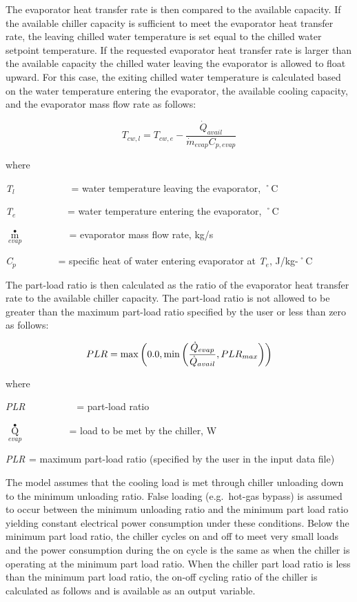 The evaporator heat transfer rate is then compared to the available capacity. If the available chiller capacity is sufficient to meet the evaporator heat transfer rate, the leaving chilled water temperature is set equal to the chilled water setpoint temperature. If the requested evaporator heat transfer rate is larger than the available capacity the chilled water leaving the evaporator is allowed to float upward. For this case, the exiting chilled water temperature is calculated based on the water temperature entering the evaporator, the available cooling capacity, and the evaporator mass flow rate as follows:

\begin{equation}
  T_{cw,l} = T_{cw,e} - \frac{\dot{Q}_{avail}}{\dot{m}_{evap}C_{p,evap}}
\end{equation}

where

\emph{T\(_{l}\)}~~~~~~~~~~~ = water temperature leaving the evaporator, ˚C

\emph{T\(_{e}\)}~~~~~~~~~~ = water temperature entering the evaporator, ˚C

\({\mathop m\limits^ \bullet_{evap}}\) ~~~~~~~~ = evaporator mass flow rate, kg/s

\emph{C\(_{p}\)}~~~~~~~~ = specific heat of water entering evaporator at \emph{T\(_{e}\)}, J/kg-˚C

The part-load ratio is then calculated as the ratio of the evaporator heat transfer rate to the available chiller capacity. The part-load ratio is not allowed to be greater than the maximum part-load ratio specified by the user or less than zero as follows:

\begin{equation}
  PLR = \max\PB{0.0,\min\PB{\frac{\dot{Q}_{evap}}{\dot{Q}_{avail}},PLR_{max}}}
\end{equation}

where

\emph{PLR}~~~~~~~~~~ = part-load ratio

\({\mathop Q\limits^ \bullet_{evap}}\) ~~~~~~~~ = load to be met by the chiller, W

\emph{PLR\(_{ }\)} = maximum part-load ratio (specified by the user in the input data file)

The model assumes that the cooling load is met through chiller unloading down to the minimum unloading ratio. False loading (e.g.~hot-gas bypass) is assumed to occur between the minimum unloading ratio and the minimum part load ratio yielding constant electrical power consumption under these conditions. Below the minimum part load ratio, the chiller cycles on and off to meet very small loads and the power consumption during the on cycle is the same as when the chiller is operating at the minimum part load ratio. When the chiller part load ratio is less than the minimum part load ratio, the on-off cycling ratio of the chiller is calculated as follows and is available as an output variable.

